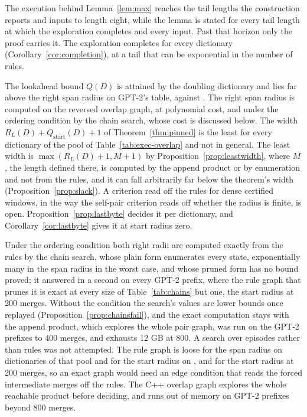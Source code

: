 \documentclass[11pt,a4paper]{article}
\theoremstyle{definition}
\theoremstyle{plain}
\newcommand{\ripple}{R_{L}}
\begin{document}
The execution behind Lemma~\ref{lem:max} reaches the tail lengths the construction reports and inputs to length eight,
while the lemma is stated for every tail length at which the exploration completes and every input. Past that horizon
only the proof carries it. The exploration completes for every dictionary (Corollary~\ref{cor:completion}), at a tail
that can be exponential in the number of rules.

The lookahead bound \(Q(D)\) is attained by the doubling dictionary and lies far above the right span radius on GPT-2's
table, \ChainGptQspan{} against \ChainGptQD{}. The right span radius is computed on the reversed overlap graph, at
polynomial cost, and under the ordering condition by the chain search, whose cost is discussed below. The width
\(\ripple(D) + Q_{\mathrm{start}}(D) + 1\) of Theorem~\ref{thm:pinned} is the least for every dictionary of the pool of
Table~\ref{tab:exec-overlap} and not in general. The least width is \(\max(\ripple(D) + 1, M + 1)\) by
Proposition~\ref{prop:leastwidth}, where \(M\), the length defined there, is computed by the append product or by
enumeration and not from the rules, and it can fall arbitrarily far below the theorem's width
(Proposition~\ref{prop:slack}). A criterion read off the rules for dense certified windows, in the way the self-pair
criterion reads off whether the radius is finite, is open. Proposition~\ref{prop:lastbyte} decides it per dictionary,
and Corollary~\ref{cor:lastbyte} gives it at start radius zero.

Under the ordering condition both right radii are computed exactly from the rules by the chain search, whose plain form
enumerates every state, exponentially many in the span radius in the worst case, and whose pruned form has no bound
proved; it answered in a second on every GPT-2 prefix, where the rule graph that prunes it is exact at every size of
Table~\ref{tab:chains} but one, the start radius at 200 merges. Without the condition the search's values are lower
bounds once replayed (Proposition~\ref{prop:chainsfail}), and the exact computation stays with the append product, which
explores the whole pair graph, was run on the GPT-2 prefixes to 400 merges, and exhausts 12 GB at 800. A search over
episodes rather than rules was not attempted. The rule graph is loose for the span radius on \ChainGraphSlackSpan{}
dictionaries of that pool and for the start radius on \ChainGraphSlackStart{}, and for the start radius at 200 merges,
so an exact graph would need an edge condition that reads the forced intermediate merges off the rules. The C++ overlap
graph explores the whole reachable product before deciding, and runs out of memory on GPT-2 prefixes beyond 800 merges.
\end{document}
